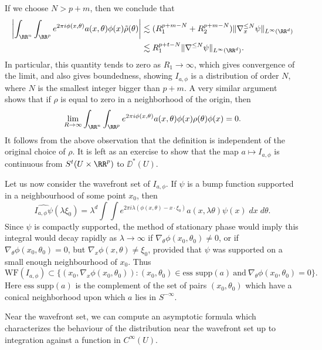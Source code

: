 %
If we choose $N > p + m$, then we conclude that
%
\begin{align*}
    \left| \int_{\RR^n} \int_{\RR^p} e^{2 \pi i \phi(x,\theta)} a(x,\theta) \phi(x) \tilde{\rho}(\theta) \right| &\lesssim (R_1^{p + m - N} + R_2^{p + m - N}) \| \nabla^{\leq N}_x \psi \|_{L^\infty(\RR^d)}\\
    &\lesssim R_1^{p + t - N} \| \nabla^{\leq N} \psi \|_{L^\infty(\RR^d)}.
\end{align*}
%
In particular, this quantity tends to zero as $R_1 \to \infty$, which gives convergence of the limit, and also gives boundedness, showing $I_{a,\phi}$ is a distribution of order $N$, where $N$ is the smallest integer bigger than $p + m$. A very similar argument shows that if $\rho$ is equal to zero in a neighborhood of the origin, then
%
\[ \lim_{R \to \infty} \int_{\RR^n} \int_{\RR^p} e^{2 \pi i \phi(x,\theta)} a(x,\theta) \phi(x) \rho(\theta) \phi(x) = 0. \]
%
It follows from the above observation that the definition is independent of the original choice of $\rho$. It is left as an exercise to show that the map $a \mapsto I_{a,\phi}$ is continuous from $S^t(U \times \RR^p)$ to $\DD^*(U)$.

Let us now consider the wavefront set of $I_{a,\phi}$. If $\psi$ is a bump function supported in a neighbourhood of some point $x_0$, then
%
\[ \widehat{I_{a,\phi} \psi}(\lambda \xi_0) = \lambda^d \int \int e^{2 \pi i \lambda (\phi(x,\theta) - x \cdot \xi_0)} a(x,\lambda \theta) \psi(x)\; dx\; d\theta. \]
%
Since $\psi$ is compactly supported, the method of stationary phase would imply this integral would decay rapidly as $\lambda \to \infty$ if $\nabla_\theta \phi(x_0,\theta_0) \neq 0$, or if $\nabla_\theta \phi(x_0,\theta_0) = 0$, but $\nabla_x \phi(x,\theta) \neq \xi_0$, provided that $\psi$ was supported on a small enough neighbourhood of $x_0$. Thus
%
\[ \text{WF}(I_{a,\phi}) \subset \{ (x_0,\nabla_x \phi(x_0,\theta_0)): (x_0,\theta_0) \in \text{ess supp}(a)\ \text{and}\ \nabla_\theta \phi(x_0,\theta_0) = 0 \}. \]
%
Here $\text{ess supp}(a)$ is the complement of the set of pairs $(x_0,\theta_0)$ which have a conical neighborhood upon which $a$ lies in $S^{-\infty}$.

Near the wavefront set, we can compute an asymptotic formula which characterizes the behaviour of the distribution near the wavefront set up to integration against a function in $C^\infty(U)$.

